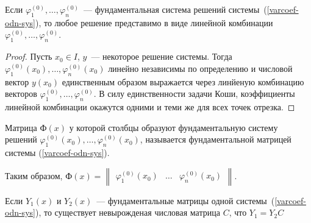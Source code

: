 \begin{theorem}\label{varcoef-solsysth}
Если \(\varphi_1^{(0)}, \ldots, \varphi_n^{(0)}\)~--- фундаментальная система решений системы~(\ref{varcoef-odn-sys}), то любое решение представимо в виде линейной комбинации \(\varphi_1^{(0)}, \ldots, \varphi_n^{(0)}\).
\end{theorem}
\begin{proof}
Пусть $x_0 \in I$, $y$~--- некоторое решение системы. Тогда \(\varphi_1^{(0)}(x_0), \ldots, \varphi_n^{(0)}(x_0)\) линейно независимы по определению и числовой вектор $y(x_0)$ единственным образом выражается через линйеную комбинацию векторов \(\varphi_1^{(0)}, \ldots, \varphi_n^{(0)}\). В силу единственности задачи Коши, коэффициенты линейной комбинации окажутся одними и теми же для всех точек отрезка.
\end{proof}

\begin{definition}
Матрица $\text{Ф}(x)$ у которой столбцы образуют фундаментальную систему решений \(\varphi_1^{(0)}(x_0), \ldots, \varphi_n^{(0)}(x_0)\), называется фундаментальной матрицей системы (\ref{varcoef-odn-sys}).
\end{definition}

Таким образом,
\(\text{Ф}(x) =
\begin{Vmatrix}
\varphi_1^{(0)}(x_0) & \ldots & \varphi_n^{(0)}(x_0)
\end{Vmatrix}
\).

\begin{lemma}
Если $Y_1(x)$ и $Y_2(x)$~--- фундаментальные матрицы одной системы~(\ref{varcoef-odn-sys}), то существует невырожденая числовая матрица $C$, что $Y_1 = Y_2 C$
\end{lemma}